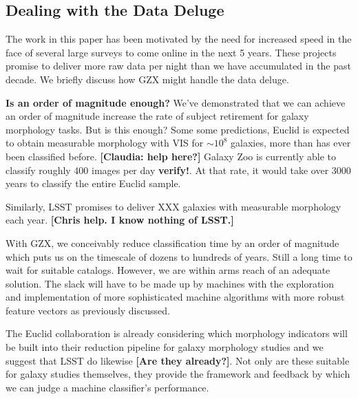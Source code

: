 \documentclass[twocolumn]{aastex6}
\begin{document}
\subsection{Dealing with the Data Deluge}
The work in this paper has been motivated by the need for increased speed in the 
face of several large surveys to come online in the next 5 years. These projects
promise to deliver more raw data per night than we have accumulated in the past 
decade. We briefly discuss how GZX might handle the data deluge.

\textbf{Is an order of magnitude enough?} We've demonstrated that we can achieve
an order of magnitude increase the rate of subject retirement for galaxy morphology
tasks. But is this enough? Some some predictions, Euclid is expected to obtain
measurable morphology with VIS for $\sim10^8$ galaxies, more than has ever been 
classified before. \textbf{[Claudia: help here?]} Galaxy Zoo is currently able to classify
roughly 400 images per day \textbf{verify!}. At that rate, it would take over 3000 years
to classify the entire Euclid sample.  

Similarly, LSST promises to deliver XXX galaxies with measurable morphology each year. 
\textbf{[Chris help. I know nothing of LSST.]}

With GZX, we conceivably reduce classification time by an order of magnitude 
which puts us on the timescale of dozens to hundreds of years. 
Still a long time to wait for suitable catalogs.
However, we are within arms reach of an adequate solution. 
The slack will have to be made up by machines with the exploration and implementation of more sophisticated machine algorithms with more robust feature vectors as previously discussed.

The Euclid collaboration is already considering which morphology indicators will
be built into their reduction pipeline for galaxy morphology studies and we suggest
that LSST do likewise \textbf{[Are they already?]}. 
Not only are these suitable for galaxy studies themselves, 
they provide the framework and feedback by which we can judge a machine classifier's 
performance. 
\end{document}
